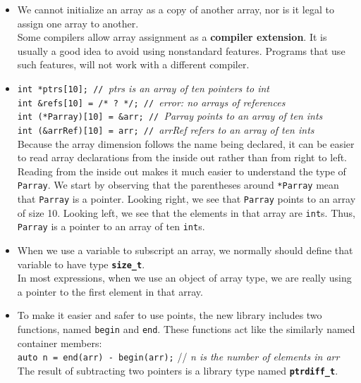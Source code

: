\begin{itemize}
\item
We cannot initialize an array as a copy of another array, nor is it legal to assign one array to another.\\
Some compilers allow array assignment as a \textbf{compiler extension}. It is usually a good idea to avoid using nonstandard features. Programs that use such features, will not work with a different compiler.

\item
\hspace*{1em}\texttt{int *ptrs[10]; // }\textit{ptrs is an array of ten pointers to int}\\
\hspace*{1em}\texttt{int \&refs[10] = /* ? */; // }\textit{error: no arrays of references}\\
\hspace*{1em}\texttt{int (*Parray)[10] = \&arr; // }\textit{Parray points to an array of ten ints}\\
\hspace*{1em}\texttt{int (\&arrRef)[10] = arr; // }\textit{arrRef refers to an array of ten ints}\\
Because the array dimension follows the name being declared, it can be easier to read array declarations from the inside out rather than from right to left. Reading from the inside out makes it much easier to understand the type of \texttt{Parray}. We start by observing that the parentheses around \texttt{*Parray} mean that \texttt{Parray} is a pointer. Looking right, we see that \texttt{Parray} points to an array of size 10. Looking left, we see that the elements in that array are \texttt{int}s. Thus, \texttt{Parray} is a pointer to an array of ten \texttt{int}s.

\item
When we use a variable to subscript an array, we normally should define that variable to have type \textbf{\texttt{size\_t}}.\\
In most expressions, when we use an object of array type, we are really using a pointer to the first element in that array.

\item
To make it easier and safer to use points, the new library includes two functions, named \texttt{begin} and \texttt{end}. These functions act like the similarly named container members:\\
\hspace*{1em}\texttt{auto n = end(arr) - begin(arr);} // \textit{n is the number of elements in arr}\\
The result of subtracting two pointers is a library type named \textbf{\texttt{ptrdiff\_t}}.


\end{itemize}
